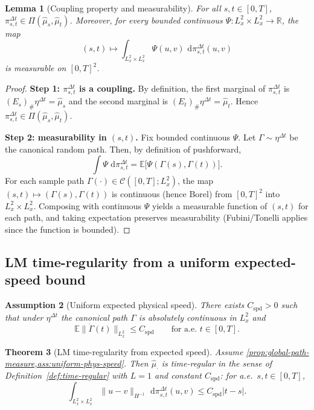 \documentclass{article}
\numberwithin{equation}{section}
\theoremstyle{plain}
\newtheorem{theorem}{Theorem}[section]
\newtheorem{lemma}[theorem]{Lemma}
\newtheorem{assumption}[theorem]{Assumption}
\theoremstyle{definition}
\theoremstyle{remark}
\newcommand{\R}{\mathbb{R}}
\newcommand{\E}{\mathbb{E}}
\newcommand{\Ccal}{\mathcal{C}}
\newcommand{\dd}{\,\mathrm{d}}
\begin{document}
\begin{lemma}[Coupling property and measurability]\label{lem:coupling-measurable}
For all $s,t\in[0,T]$, $\pi^{\Delta t}_{s,t}\in\Pi(\widehat\mu_s,\widehat\mu_t)$.
Moreover, for every bounded continuous $\Psi:L^2_x\times L^2_x\to\R$, the map
\[
(s,t)\longmapsto \int_{L^2_x\times L^2_x}\Psi(u,v)\,\dd\pi^{\Delta t}_{s,t}(u,v)
\]
is measurable on $[0,T]^2$.
\end{lemma}

\begin{proof}
\textbf{Step 1: $\pi^{\Delta t}_{s,t}$ is a coupling.}
By definition, the first marginal of $\pi^{\Delta t}_{s,t}$ is $(E_s)_\#\eta^{\Delta t}=\widehat\mu_s$ and the second marginal is
$(E_t)_\#\eta^{\Delta t}=\widehat\mu_t$. Hence $\pi^{\Delta t}_{s,t}\in\Pi(\widehat\mu_s,\widehat\mu_t)$.

\smallskip
\noindent\textbf{Step 2: measurability in $(s,t)$.}
Fix bounded continuous $\Psi$. Let $\Gamma\sim\eta^{\Delta t}$ be the canonical random path.
Then, by definition of pushforward,
\[
\int \Psi\,\dd\pi^{\Delta t}_{s,t}=\E\big[\Psi(\Gamma(s),\Gamma(t))\big].
\]
For each sample path $\Gamma(\cdot)\in\Ccal([0,T];L^2_x)$, the map $(s,t)\mapsto(\Gamma(s),\Gamma(t))$ is continuous (hence Borel)
from $[0,T]^2$ into $L^2_x\times L^2_x$. Composing with continuous $\Psi$ yields a measurable function of $(s,t)$ for each path,
and taking expectation preserves measurability (Fubini/Tonelli applies since the function is bounded).
\end{proof}

\subsection{LM time-regularity from a uniform expected-speed bound}

\begin{assumption}[Uniform expected physical speed]\label{ass:uniform-phys-speed}
There exists $C_{\mathrm{spd}}>0$ such that under $\eta^{\Delta t}$ the canonical path $\Gamma$ is absolutely continuous in $L^2_x$ and
\begin{equation}\label{eq:phys-speed-assumption}
\E\|\dot\Gamma(t)\|_{L^2_x}\le C_{\mathrm{spd}}\qquad\text{for a.e.\ }t\in[0,T].
\end{equation}
\end{assumption}

\begin{theorem}[LM time-regularity from expected speed]\label{thm:LM-time-regularity}
Assume \cref{prop:global-path-measure,ass:uniform-phys-speed}. Then $\widehat\mu_\cdot$ is time-regular in the sense of
Definition~\ref{def:time-regular} with $L=1$ and constant $C_{\mathrm{spd}}$: for a.e.\ $s,t\in[0,T]$,
\begin{equation}\label{eq:LM-time-reg-conclusion}
\int_{L^2_x\times L^2_x}\|u-v\|_{H^{-1}}\,\dd\pi^{\Delta t}_{s,t}(u,v)\le C_{\mathrm{spd}}|t-s|.
\end{equation}
\end{theorem}
\end{document}
